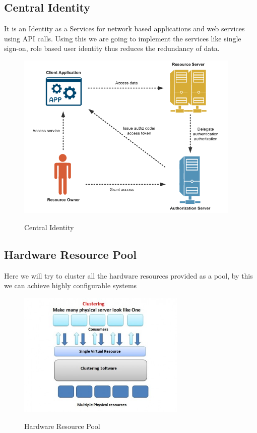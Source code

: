 \documentclass[]{article}
\begin{document}
\subsection{Central Identity}
\hspace{1cm} It is an Identity as a Services for network based applications and web services using API calls. Using this we are going to implement the services like single sign-on, role based user identity thus reduces the redundancy of data.

\begin{center}

\begin{figure}[H]
 \includegraphics[height=8cm]{./oauth.png} \\
 \caption{Central Identity\label{fig:oauth}} 
\end{figure}

\end{center}

\subsection{Hardware Resource Pool}

\hspace{1cm} Here we will try to cluster all the hardware resources provided as a pool, by this we can achieve highly configurable systems


\begin{figure}[H]
 \includegraphics[height=6cm]{./cluster.jpg} \\
 \caption{Hardware Resource Pool \label{fig:cluster}} 
\end{figure}
\end{document}
